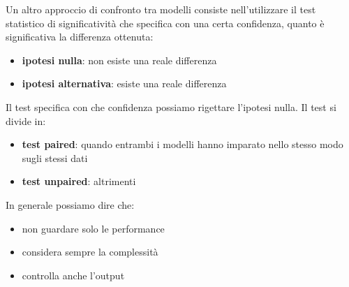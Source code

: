 Un altro approccio di confronto tra modelli consiste nell'utilizzare il test statistico
di significatività che specifica con una certa confidenza, quanto è significativa
la differenza ottenuta:
\begin{itemize}
    \item \textbf{ipotesi nulla}: non esiste una reale differenza
    \item \textbf{ipotesi alternativa}: esiste una reale differenza
\end{itemize}
Il test specifica con che confidenza possiamo rigettare l'ipotesi nulla.
Il test si divide in:
\begin{itemize}
    \item \textbf{test paired}: quando entrambi i modelli hanno imparato nello
          stesso modo sugli stessi dati
    \item \textbf{test unpaired}: altrimenti
\end{itemize}
In generale possiamo dire che:
\begin{itemize}
    \item non guardare solo le performance
    \item considera sempre la complessità
    \item controlla anche l'output
\end{itemize}